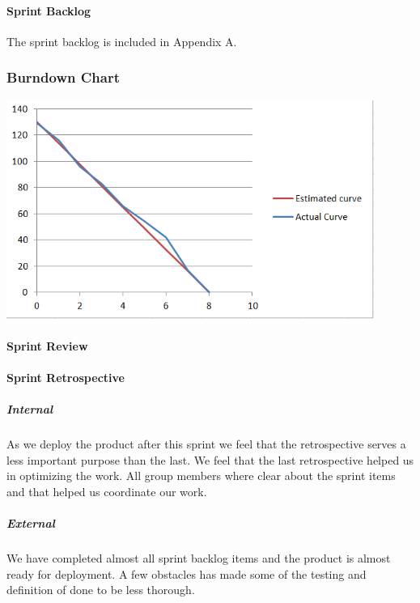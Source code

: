 \documentclass[a4paper,11pt,report]{report}
\begin{document}
			\paragraph{Sprint Backlog}
			The sprint backlog is included in Appendix A.
			\subsubsection{Burndown Chart}
\includegraphics[width=12cm]{./BurnDownChart.png}
			\paragraph{Sprint Review}
			\paragraph{Sprint Retrospective}
				\subparagraph{Internal}
				As we deploy the product after this sprint we feel that the retrospective serves a less important purpose than the last. We feel that the last retrospective helped us in optimizing the work. All group members where clear about the sprint items and that helped us coordinate our work.
				\subparagraph{External}
				We have completed almost all sprint backlog items and the product is almost ready for deployment. A few obstacles has made some of the testing and definition of done to be less thorough.

\newpage
\end{document}
